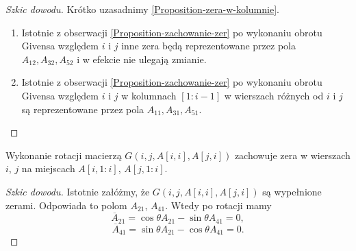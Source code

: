 \documentclass[12pt,a4paper]{report}
\newcommand{\mx}[1]{{#1}}
\begin{document}
\begin{proof}[Szkic dowodu]
Krótko uzasadnimy \ref{Proposition-zera-w-kolumnie}.
\begin{enumerate}
\item Istotnie z obserwacji \ref{Proposition-zachowanie-zer} po wykonaniu obrotu Givensa względem $i$ i $j$ inne zera będą reprezentowane przez pola $\mx{A}_{12}, \mx{A}_{32}, \mx{A}_{52}$ i w efekcie nie ulegają zmianie.
\item Istotnie z obserwacji \ref{Proposition-zachowanie-zer} po wykonaniu obrotu Givensa względem $i$ i $j$ w kolumnach $[1:i-1]$ w wierszach różnych od $i$ i $j$ są reprezentowane przez pola $\mx{A}_11,\mx{A}_31,\mx{A}_51$.
\end{enumerate}
\end{proof}



\begin{proposition}\label{Proposition-zera-w-wierszach}
Wykonanie rotacji macierzą $\mx{G}(i,j, \mx{A}[i,i], \mx{A}[j,i])$ zachowuje zera w wierszach $i$, $j$ na miejscach $\mx{A}[i,1:i]$, $\mx{A}[j, 1:i]$. 
\end{proposition}
\begin{proof}[Szkic dowodu]

Istotnie załóżmy, że $\mx{G}(i,j, \mx{A}[i,i], \mx{A}[j,i])$ są wypełnione zerami. Odpowiada to polom $\mx{A}_{21}$, $\mx{A}_{41}$. Wtedy po rotacji mamy 
$$
\overline{\mx{A}}_{21} = \cos\theta\mx{A}_{21} - \sin\theta\mx{A}_{41} = 0,
$$  
$$
\overline{\mx{A}}_{41} = \sin\theta\mx{A}_{21} - \cos\theta\mx{A}_{41} = 0.
$$
\end{proof}
\end{document}
